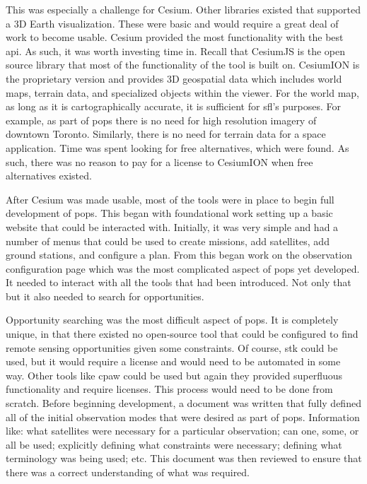 This was especially a challenge for Cesium. Other libraries existed that
supported a 3D Earth visualization. These were basic and would require a great
deal of work to become usable. Cesium provided the most functionality with the
best \gls{api}. As such, it was worth investing time in.  Recall that CesiumJS
is the open source library that most of the functionality of the tool is built
on.  CesiumION is the proprietary version and provides 3D geospatial data which
includes world maps, terrain data, and specialized objects within the viewer.
For the world map, as long as it is cartographically accurate, it is sufficient
for \gls{sfl}'s purposes. For example, as part of \gls{pops} there is no need
for high resolution imagery of downtown Toronto.  Similarly, there is no need
for terrain data for a space application.  Time was spent looking for free
alternatives, which were found.  As such, there was no reason to pay for a
license to CesiumION when free alternatives existed.

After Cesium was made usable, most of the tools were in place to begin full
development of \gls{pops}. This began with foundational work setting up a basic
website that could be interacted with. Initially, it was very simple and had a
number of menus that could be used to create missions, add satellites, add
ground stations, and configure a plan. From this began work on the observation
configuration page which was the most complicated aspect of \gls{pops} yet
developed. It needed to interact with all the tools that had been introduced.
Not only that but it also needed to search for opportunities.

Opportunity searching was the most difficult aspect of \gls{pops}. It is
completely unique, in that there existed no open-source tool that could be
configured to find remote sensing opportunities given some constraints. Of
course, \gls{stk} could be used, but it would require a license and would need
to be automated in some way. Other tools like \gls{cpaw} could be used but
again they provided superfluous functionality and require licenses. This
process would need to be done from scratch. Before beginning development, a
document was written that fully defined all of the initial observation modes
that were desired as part of \gls{pops}. Information like: what satellites were
necessary for a particular observation; can one, some, or all be used;
explicitly defining what constraints were necessary; defining what terminology
was being used; etc. This document was then reviewed to ensure that there was a
correct understanding of what was required.

